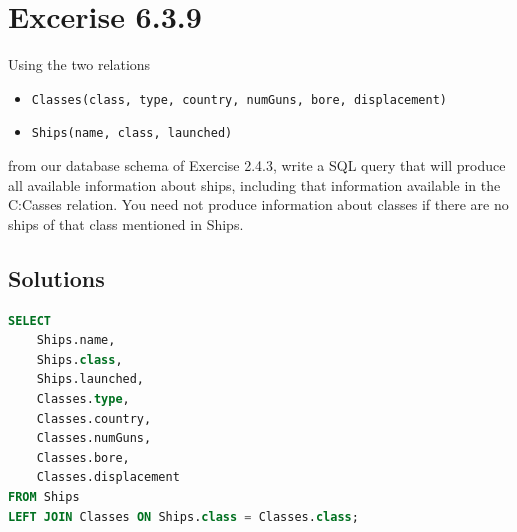 \documentclass{cshwk}
\begin{document}
\section{Excerise 6.3.9}
Using the two relations

\begin{itemize}
    \item \texttt{Classes(class, type, country, numGuns, bore, displacement)}
    \item \texttt{Ships(name, class, launched)}
\end{itemize}
from our database schema of Exercise 2.4.3, write a SQL query that will produce
all available information about ships, including that information available in the
C:Casses relation. You need not produce information about classes if there are
no ships of that class mentioned in Ships.

\subsection{Solutions}

\begin{lstlisting}[language=sql]
SELECT 
    Ships.name, 
    Ships.class, 
    Ships.launched, 
    Classes.type, 
    Classes.country, 
    Classes.numGuns, 
    Classes.bore, 
    Classes.displacement
FROM Ships
LEFT JOIN Classes ON Ships.class = Classes.class;
\end{lstlisting}
\end{document}
